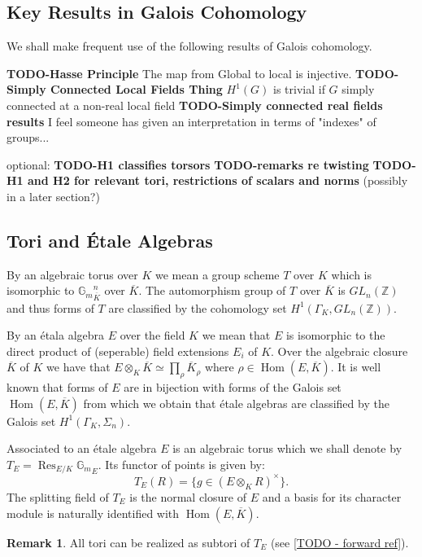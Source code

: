 \documentclass{article}
\theoremstyle{plain}
\theoremstyle{definition}
\newtheorem{remark}[theorem]{Remark}
\numberwithin{equation}{section}
\DeclareMathOperator{\Hom}{Hom}
\DeclareMathOperator{\Res}{Res}
\newcommand{\ZZ}{\mathbb{Z}}
\newcommand{\Gm}{\mathbb{G}_m}
\newcommand{\GalKbK}{\Gamma_K}
\newcommand{\TODO}[1]{\textbf{TODO-#1}}
\begin{document}
\subsection{Key Results in Galois Cohomology}

We shall make frequent use of the following results of Galois cohomology.

\TODO{Hasse Principle} The map from Global to local is injective.
\TODO{Simply Connected Local Fields Thing} $H^1(G)$ is trivial if $G$ simply connected at a non-real local field
\TODO{Simply connected real fields results} I feel someone has given an interpretation in terms of "indexes" of groups...

optional:
\TODO{H1 classifies torsors}
\TODO{remarks re twisting}
\TODO{H1 and H2 for relevant tori, restrictions of scalars and norms} (possibly in a later section?)


\subsection{Tori and \'Etale Algebras}

By an algebraic torus over $K$ we mean a group scheme $T$ over $K$ which is isomorphic to ${\Gm}_{\overline{K}}^n$ over $\overline{K}$.
The automorphism group of $T$ over $\overline{K}$ is $GL_n(\ZZ)$ and thus forms of $T$ are classified by the cohomology set $H^1(\GalKbK,GL_n(\ZZ))$.

By an \'etala algebra $E$ over the field $K$ we mean that $E$ is isomorphic to the direct product of (seperable) field extensions $E_i$ of $K$.
Over the algebraic closure $\overline{K}$ of $K$ we have that $E\otimes_K \overline{K} \simeq \prod_\rho \overline{K}_\rho$ where $\rho \in \Hom(E,\overline{K})$.
It is well known that forms of $E$ are in bijection with forms of the Galois set $\Hom(E,\overline{K})$ from which we obtain that \'etale algebras are classified by the Galois set $H^1(\GalKbK, \Sigma_n)$.

Associated to an \'etale algebra $E$ is an algebraic torus which we shall denote by $T_E = \Res_{E/K} {\Gm}_E$.
Its functor of points is given by:
\[ T_E(R) = \{ g \in (E\otimes_K R)^\times \}. \]
The splitting field of $T_E$ is the normal closure of $E$ and a basis for its character module is naturally identified with $\Hom(E,\overline{K})$.

\begin{remark}
All tori can be realized as subtori of $T_E$ (see \ref{TODO - forward ref}).
\end{remark}
\end{document}

